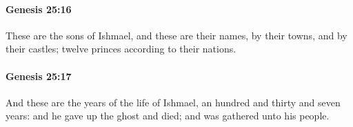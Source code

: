 		\paragraph{Genesis 25:16} %
			\label{GENESIS-25-16}

			These are the sons of Ishmael, and these are their names, by their towns, and by their castles; twelve princes according to their nations.


		\paragraph{Genesis 25:17} %
			\label{GENESIS-25-17}

			And these are the years of the life of Ishmael, an hundred and thirty and seven years: and he gave up the ghost and died; and was gathered unto his people.


